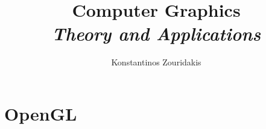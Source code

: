 \documentclass[a4paper]{article}   	%
\title{Computer Graphics \\ \Large{\textit{Theory and Applications}}}
\author{Konstantinos Zouridakis}
\date{}
\begin{document}
\maketitle

\tableofcontents

\section{OpenGL}



\end{document}
